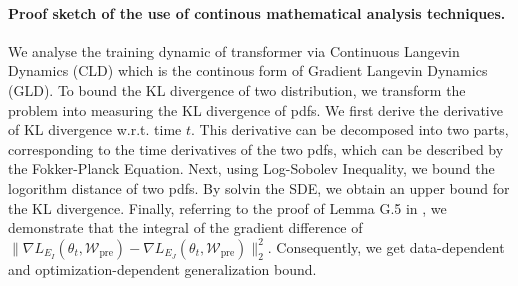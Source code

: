 \paragraph{Proof sketch of the use of continous mathematical analysis techniques.} We analyse the training dynamic of transformer via Continuous Langevin Dynamics (CLD) which is the continous form of Gradient Langevin Dynamics (GLD). To bound the KL divergence of two distribution, we transform the problem into measuring the KL divergence of pdfs. We first derive the derivative of KL divergence w.r.t. time $t$. This derivative can be decomposed into two parts, corresponding to the time derivatives of the two pdfs, which can be described by the Fokker-Planck Equation. Next, using Log-Sobolev Inequality, we bound the logorithm distance of two pdfs. By solvin the SDE, we obtain an upper bound for the KL divergence. Finally, referring to the proof of Lemma G.5 in \cite{li2019generalization}, we demonstrate that the integral of the gradient difference of $\big\|\nabla L_{E_I}(\theta_t, \mathcal{W}_{\text{pre}})-\nabla L_{E_J}(\theta_t, \mathcal{W}_{\text{pre}})\big\|_2^2$. Consequently, we get data-dependent and optimization-dependent generalization bound.



